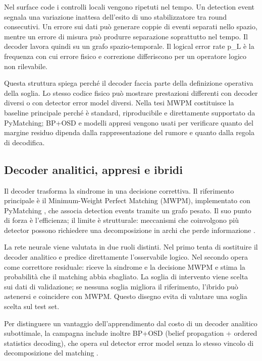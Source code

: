Nel surface code i controlli locali vengono ripetuti nel tempo. Un detection event segnala una variazione inattesa dell'esito di uno stabilizzatore tra round consecutivi. Un errore sui dati può generare coppie di eventi separati nello spazio, mentre un errore di misura può produrre separazione soprattutto nel tempo. Il decoder lavora quindi su un grafo spazio-temporale. Il logical error rate p\_L è la frequenza con cui errore fisico e correzione differiscono per un operatore logico non rilevabile.

Questa struttura spiega perché il decoder faccia parte della definizione operativa della soglia. Lo stesso codice fisico può mostrare prestazioni differenti con decoder diversi o con detector error model diversi. Nella tesi MWPM costituisce la baseline principale perché è standard, riproducibile e direttamente supportato da PyMatching; BP+OSD e modelli appresi vengono usati per verificare quanto del margine residuo dipenda dalla rappresentazione del rumore e quanto dalla regola di decodifica.

\subsection{Decoder analitici, appresi e ibridi}\label{sec:finale_3_4_3}

Il decoder trasforma la sindrome in una decisione correttiva. Il riferimento principale è il Minimum-Weight Perfect Matching (MWPM), implementato con PyMatching \cite{fowler2012,pymatching2021,dennis2002topological}, che associa detection events tramite un grafo pesato. Il suo punto di forza è l'efficienza; il limite è strutturale: meccanismi che coinvolgono più detector possono richiedere una decomposizione in archi che perde informazione \cite{fowler2012,dennis2002topological}.

La rete neurale viene valutata in due ruoli distinti. Nel primo tenta di sostituire il decoder analitico e predice direttamente l'osservabile logico. Nel secondo opera come correttore residuale: riceve la sindrome e la decisione MWPM e stima la probabilità che il matching abbia sbagliato. La soglia di intervento viene scelta sui dati di validazione; se nessuna soglia migliora il riferimento, l'ibrido può astenersi e coincidere con MWPM. Questo disegno evita di valutare una soglia scelta sul test set.

Per distinguere un vantaggio dell'apprendimento dal costo di un decoder analitico subottimale, la campagna include inoltre BP+OSD (belief propagation + ordered statistics decoding), che opera sul detector error model senza lo stesso vincolo di decomposizione del matching \cite{roffe2020,panteleev2021}.


